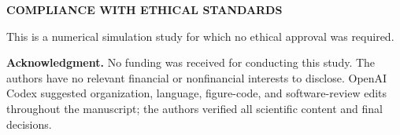 \documentclass{article}
\newcommand{\confsectionstar}[1]{%
    \par\medskip
    {\centering\bfseries\MakeUppercase{#1}\par}
    \smallskip}
\begin{document}
\confsectionstar{Compliance with Ethical Standards}
This is a numerical simulation study for which no ethical approval was required.

\par\smallskip\noindent\textbf{Acknowledgment.}
No funding was received for conducting this study. The authors have no relevant
financial or \mbox{nonfinancial} interests to disclose.
OpenAI Codex suggested organization, language, figure-code, and software-review
edits throughout the manuscript; the authors verified all scientific content
and final decisions.

\clearpage
\balance


\end{document}
